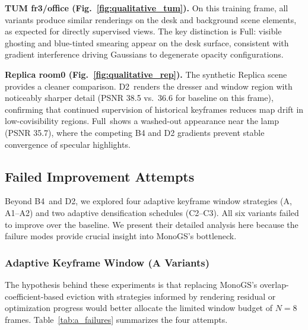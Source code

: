 \documentclass[conference]{IEEEtran}
\begin{document}
\noindent\textbf{TUM fr3/office (Fig.~\ref{fig:qualitative_tum}).}
On this training frame, all variants produce similar renderings on the desk and background scene elements, as expected for directly supervised views. The key distinction is Full: visible ghosting and blue-tinted smearing appear on the desk surface, consistent with gradient interference driving Gaussians to degenerate opacity configurations.

\noindent\textbf{Replica room0 (Fig.~\ref{fig:qualitative_rep}).}
The synthetic Replica scene provides a cleaner comparison. {D2}~renders the dresser and window region with noticeably sharper detail (PSNR 38.5 vs.\ 36.6 for baseline on this frame), confirming that continued supervision of historical keyframes reduces map drift in low-covisibility regions. Full~shows a washed-out appearance near the lamp (PSNR 35.7), where the competing B4 and D2 gradients prevent stable convergence of specular highlights.



\subsection{Failed Improvement Attempts}
\label{sec:failed}

Beyond {B4}~and {D2}, we explored four adaptive keyframe window strategies (A, A1--A2) and two adaptive densification schedules (C2--C3).
All six variants failed to improve over the baseline.
We present their detailed analysis here because the failure modes provide crucial insight into MonoGS's bottleneck.

\subsubsection{Adaptive Keyframe Window (A Variants)}

The hypothesis behind these experiments is that replacing MonoGS's overlap-coefficient-based eviction with strategies informed by rendering residual or optimization progress would better allocate the limited window budget of $N=8$ frames.
Table~\ref{tab:a_failures} summarizes the four attempts.
\end{document}
